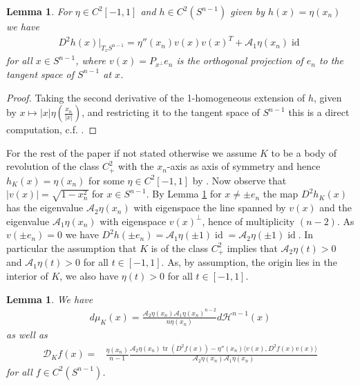 \documentclass[12pt,twoside]{amsart}
\numberwithin{satz}{section}
\newtheorem{lemma}[satz]{Lemma}
\theoremstyle{definition}
\numberwithin{equation}{section}
\newcommand\id{\operatorname{id}}
\newcommand\tr{\operatorname{tr}}
\begin{document}
	\begin{lemma}\label{zonal_hesssian}
		For $\eta\in C^2[-1,1]$ and $h\in C^2(S^{n-1})$ given by $h(x)=\eta(x_n)$ we have
		\begin{align*}
			D^2h(x)\big|_{T_xS^{n-1}} = \eta''(x_n)v(x) v(x)^T + \mathcal{A}_1\eta(x_n)\id
		\end{align*}
		for all $x\in S^{n-1}$, where $v(x)=P_{x^\perp}e_n$ is the orthogonal projection of $e_n$ to the tangent space of $S^{n-1}$ at $x$.
	\end{lemma}
	
	\begin{proof}
		Taking the second derivative of the 1-homogeneous extension of $h$, given by $x\mapsto |x|\eta\left(\frac{x_n}{|x|}\right)$, and restricting it to the tangent space of $S^{n-1}$ this is a direct computation, c.f. \cite[(5.3)]{ortegamorenoschuster}.
	\end{proof}
	
	For the rest of the paper if not stated otherwise we assume $K$ to be a body of revolution of the class $C^2_+$ with the $x_n$-axis as axis of symmetry and hence $h_K(x)=\eta(x_n)$ for some $\eta\in C^2[-1,1]$ by \cite[Theorem 2.17]{braunerhofstaetterortegamoreno}. Now observe that $|v(x)|=\sqrt{1-x_n^2}$ for $x\in S^{n-1}$. By Lemma \ref{zonal_hesssian} for $x\neq \pm e_n$ the map $D^2h_K(x)$ has the eigenvalue $\mathcal{A}_2\eta(x_n)$ with eigenspace the line spanned by $v(x)$ and the eigenvalue $\mathcal{A}_1\eta(x_n)$ with eigenspace $v(x)^\perp$, hence of multiplicity $(n-2)$. As $v(\pm e_n)=0$ we have $D^2h(\pm e_n)=\mathcal{A}_1\eta(\pm 1)\id=\mathcal{A}_2\eta(\pm 1)\id$. In particular the assumption that $K$ is of the class $C^2_+$ implies that $\mathcal{A}_2\eta(t)>0$ and $\mathcal{A}_1\eta(t)>0$ for all $t\in [-1,1]$. As, by assumption, the origin lies in the interior of $K$, we also have $\eta(t)>0$ for all $t\in[-1,1]$. 
	
	\begin{lemma}\label{lemma_explicit_mixed_discriminant}
		We have
		\begin{align*}
			d\mu_K(x)=\frac{\mathcal{A}_2\eta(x_n)\mathcal{A}_1\eta(x_n)^{n-2}}{n\eta(x_n)}d\mathcal{H}^{n-1}(x)
		\end{align*}
		as well as
		\begin{align*}
			\mathcal{D}_K f(x)=&\frac{\eta(x_n)}{n-1}\frac{\mathcal{A}_2\eta(x_n)\tr(D^2f(x))-\eta''(x_n)\langle v(x),D^2f(x)v(x)\rangle}{\mathcal{A}_2\eta(x_n)\mathcal{A}_1\eta(x_n)}
		\end{align*}
		for all $f\in C^2(S^{n-1})$.
	\end{lemma}
	
\end{document}
